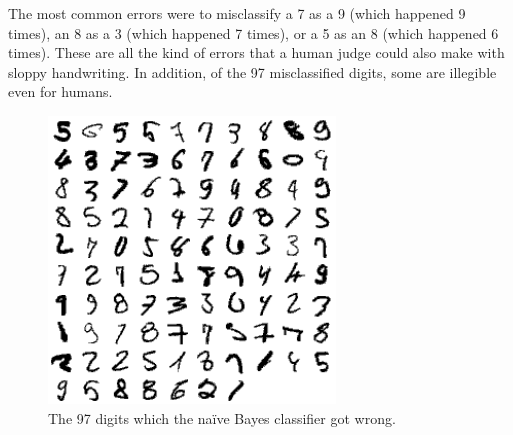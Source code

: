\documentclass[11pt]{article}
\begin{document}
The most common errors were to misclassify a 7 as a 9 (which happened 9 times), an 8 as
a 3 (which happened 7 times), or a 5 as an 8 (which happened 6 times). These are all the
kind of errors that a human judge could also make with sloppy handwriting. In addition,
of the 97 misclassified digits, some are illegible even for humans.

\begin{figure}[h!]
\centering
\includegraphics[height=3in, width=3in]{digits.png}
\caption{The 97 digits which the na{\"i}ve Bayes classifier got wrong.}
\label{nbc_digits}
\end{figure}
\end{document}
